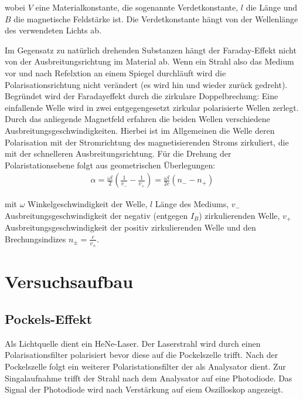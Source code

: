 \documentclass[12pt]{article}
\begin{document}
wobei $V$ eine Materialkonstante, die sogenannte Verdetkonstante, $l$ die Länge und $B$ die magnetische Feldstärke ist.
Die Verdetkonstante hängt von der Wellenlänge des verwendeten Lichts ab.

Im Gegensatz zu natürlich drehenden Substanzen hängt der Faraday-Effekt nicht von der Ausbreitungsrichtung im Material ab.
Wenn ein Strahl also das Medium vor und nach Refelxtion an einem Spiegel durchläuft wird die Polarisationsrichtung nicht verändert (es wird hin und wieder zurück gedreht).\\

Begründet wird der Faradayeffekt durch die zirkulare Doppelbrechung: Eine einfallende Welle wird in zwei entgegengesetzt zirkular polarisierte Wellen zerlegt. Durch das anliegende Magnetfeld erfahren die beiden Wellen verschiedene Ausbreitungsgeschwindigkeiten. Hierbei ist im Allgemeinen die Welle deren Polarisation mit der Stromrichtung des magnetisierenden Stroms zirkuliert, die mit der schnelleren Ausbreitungsrichtung.
Für die Drehung der Polaristationsebene folgt aus geometrischen Überlegungen:
\begin{align}
 \alpha = \frac{\omega l}{2} \left( \frac{1}{v_-} - \frac{1}{v_+} \right) = \frac{\omega l}{2 c} ( n_- - n_+)
\end{align}

mit $\omega$ Winkelgeschwindigkeit der Welle, $l$ Länge des Mediums, $v_-$ Ausbreitungsgeschwindigkeit der negativ (entgegen $I_B$) zirkulierenden Welle, $v_+$ Ausbreitungsgeschwindigkeit der positiv zirkulierenden Welle und den Brechungsindizes $n_\pm = \frac{c}{v_\pm}$.




\section{Versuchsaufbau}

\subsection{Pockels-Effekt}

Als Lichtquelle dient ein HeNe-Laser. Der Laserstrahl wird durch einen Polarisationsfilter polarisiert bevor diese auf die Pockelszelle trifft. Nach der Pockelszelle folgt ein weiterer Polaristationsfilter der als Analysator dient. Zur Singalaufnahme trifft der Strahl nach dem Analysator auf eine Photodiode. Das Signal der Photodiode wird nach Verstärkung auf eiem Oszilloskop angezeigt.
\end{document}
